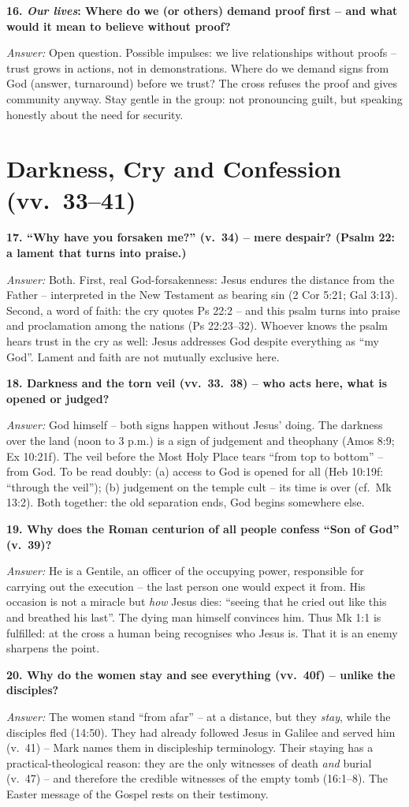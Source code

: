 \documentclass[12pt,a4paper]{article}
\newcommand{\frage}[1]{\par\vspace{0.7em}\noindent\textbf{#1}\par}
\newcommand{\antwort}[1]{\par\noindent\textit{Answer:} #1\par}
\begin{document}
\frage{16. \emph{Our lives}: Where do we (or others) demand proof first -- and what would it mean to believe without proof?}
\antwort{Open question. Possible impulses: we live relationships without proofs -- trust grows in actions, not in demonstrations. Where do we demand signs from God (answer, turnaround) before we trust? The cross refuses the proof and gives community anyway. Stay gentle in the group: not pronouncing guilt, but speaking honestly about the need for security.}

\section*{Darkness, Cry and Confession (vv.~33--41)}

\frage{17. ``Why have you forsaken me?'' (v.~34) -- mere despair? (Psalm 22: a lament that turns into praise.)}
\antwort{Both. First, real God-forsakenness: Jesus endures the distance from the Father -- interpreted in the New Testament as bearing sin (2 Cor 5:21; Gal 3:13). Second, a word of faith: the cry quotes Ps 22:2 -- and this psalm turns into praise and proclamation among the nations (Ps 22:23--32). Whoever knows the psalm hears trust in the cry as well: Jesus addresses God despite everything as ``my God''. Lament and faith are not mutually exclusive here.}

\frage{18. Darkness and the torn veil (vv.~33.~38) -- who acts here, what is opened or judged?}
\antwort{God himself -- both signs happen without Jesus' doing. The darkness over the land (noon to 3 p.m.) is a sign of judgement and theophany (Amos 8:9; Ex 10:21f). The veil before the Most Holy Place tears ``from top to bottom'' -- from God. To be read doubly: (a) access to God is opened for all (Heb 10:19f: ``through the veil''); (b) judgement on the temple cult -- its time is over (cf.~Mk 13:2). Both together: the old separation ends, God begins somewhere else.}

\frage{19. Why does the Roman centurion of all people confess ``Son of God'' (v.~39)?}
\antwort{He is a Gentile, an officer of the occupying power, responsible for carrying out the execution -- the last person one would expect it from. His occasion is not a miracle but \emph{how} Jesus dies: ``seeing that he cried out like this and breathed his last''. The dying man himself convinces him. Thus Mk 1:1 is fulfilled: at the cross a human being recognises who Jesus is. That it is an enemy sharpens the point.}

\frage{20. Why do the women stay and see everything (vv.~40f) -- unlike the disciples?}
\antwort{The women stand ``from afar'' -- at a distance, but they \emph{stay}, while the disciples fled (14:50). They had already followed Jesus in Galilee and served him (v.~41) -- Mark names them in discipleship terminology. Their staying has a practical-theological reason: they are the only witnesses of death \emph{and} burial (v.~47) -- and therefore the credible witnesses of the empty tomb (16:1--8). The Easter message of the Gospel rests on their testimony.}
\end{document}
